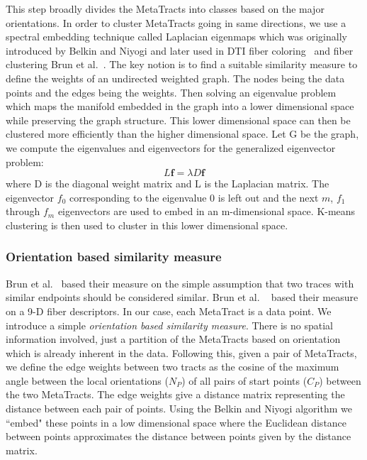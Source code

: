 This step broadly divides the MetaTracts into classes based on the major orientations.
In order to cluster MetaTracts going in same directions, we use a spectral embedding technique called Laplacian eigenmaps which was originally introduced by Belkin and Niyogi \cite{Belkin01} and later used in DTI fiber coloring~\cite{Brun2003} and fiber clustering Brun et al.~\cite{Brun2004}. The key notion is to find a suitable similarity measure to define the weights of an undirected weighted graph. The nodes being the data points and the edges being the weights. Then solving an eigenvalue problem which maps the manifold embedded in the graph into a lower dimensional space while preserving the graph structure.
This lower dimensional space can then be clustered more efficiently than the higher dimensional space. 
Let G be the graph, we compute the eigenvalues and eigenvectors for the generalized eigenvector problem:
\begin{equation}\label{equn:eigenMaps}
L\textbf{f}=\lambda D\textbf{f}
\end{equation}
where D is the diagonal weight matrix and L is the Laplacian matrix. The eigenvector \textbf{${f}_{0}$} corresponding to the eigenvalue 0 is left out and the next $m$, {\textbf{${f}_{1}$} through \textbf{${f}_{m}$}} eigenvectors are used to embed in an m-dimensional space. K-means clustering is then used to cluster in this lower dimensional space.


\subsubsection{Orientation based similarity measure}
\label{subsec:ori-sim-mes}
Brun et al.~\cite{Brun2003} based their measure on the simple assumption that two traces with similar endpoints should 
be considered similar. Brun et al. ~\cite{Brun2004} based their measure on a 9-D fiber descriptors.
In our case, each MetaTract is a data point. We introduce a simple \textit{orientation based similarity measure}. There is no spatial information involved, just a partition of the MetaTracts based on orientation which is already inherent in the data.
Following this, given a pair of  MetaTracts, we define the edge weights between two tracts as the cosine of the maximum angle between the local orientations ($N_P$) of all pairs of start points ($C_P$) between the two MetaTracts.
The edge weights give a distance matrix representing the distance between each pair of points.
Using the Belkin and Niyogi algorithm we ``embed" these points in a low dimensional space where the Euclidean distance between points approximates the distance between points given by the distance matrix.

